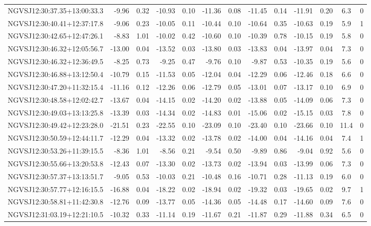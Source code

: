 \begin{tabular}{lrrrrrrrrrrcc}
NGVSJ12:30:37.35+13:00:33.3 & -9.96 & 0.32 & -10.93 & 0.10 & -11.36 & 0.08 & -11.45 & 0.14 & -11.91 & 0.20 & 6.3 & 0 \\
NGVSJ12:30:40.41+12:37:17.8 & -9.06 & 0.23 & -10.05 & 0.11 & -10.44 & 0.10 & -10.64 & 0.35 & -10.63 & 0.19 & 5.9 & 1 \\
NGVSJ12:30:42.65+12:47:26.1 & -8.83 & 1.01 & -10.02 & 0.42 & -10.60 & 0.10 & -10.39 & 0.78 & -10.15 & 0.19 & 5.8 & 0 \\
NGVSJ12:30:46.32+12:05:56.7 & -13.00 & 0.04 & -13.52 & 0.03 & -13.80 & 0.03 & -13.83 & 0.04 & -13.97 & 0.04 & 7.3 & 0 \\
NGVSJ12:30:46.32+12:36:49.5 & -8.25 & 0.73 & -9.25 & 0.47 & -9.76 & 0.10 & -9.87 & 0.53 & -10.35 & 0.19 & 5.6 & 0 \\
NGVSJ12:30:46.88+13:12:50.4 & -10.79 & 0.15 & -11.53 & 0.05 & -12.04 & 0.04 & -12.29 & 0.06 & -12.46 & 0.18 & 6.6 & 0 \\
NGVSJ12:30:47.20+11:32:15.4 & -11.16 & 0.12 & -12.26 & 0.06 & -12.79 & 0.05 & -13.01 & 0.07 & -13.17 & 0.10 & 6.9 & 0 \\
NGVSJ12:30:48.58+12:02:42.7 & -13.67 & 0.04 & -14.15 & 0.02 & -14.20 & 0.02 & -13.88 & 0.05 & -14.09 & 0.06 & 7.3 & 0 \\
NGVSJ12:30:49.03+13:13:25.8 & -13.39 & 0.03 & -14.34 & 0.02 & -14.83 & 0.01 & -15.06 & 0.02 & -15.15 & 0.03 & 7.8 & 0 \\
NGVSJ12:30:49.42+12:23:28.0 & -21.51 & 0.23 & -22.55 & 0.10 & -23.09 & 0.10 & -23.40 & 0.10 & -23.66 & 0.10 & 11.4 & 0 \\
NGVSJ12:30:50.59+12:44:11.7 & -12.29 & 0.04 & -13.32 & 0.02 & -13.78 & 0.02 & -14.00 & 0.04 & -14.16 & 0.04 & 7.4 & 1 \\
NGVSJ12:30:53.26+11:39:15.5 & -8.36 & 1.01 & -8.56 & 0.21 & -9.54 & 0.50 & -9.89 & 0.86 & -9.04 & 0.92 & 5.6 & 0 \\
NGVSJ12:30:55.66+13:20:53.8 & -12.43 & 0.07 & -13.30 & 0.02 & -13.73 & 0.02 & -13.94 & 0.03 & -13.99 & 0.06 & 7.3 & 0 \\
NGVSJ12:30:57.37+13:13:51.7 & -9.05 & 0.53 & -10.03 & 0.21 & -10.48 & 0.16 & -10.71 & 0.28 & -11.13 & 0.19 & 6.0 & 0 \\
NGVSJ12:30:57.77+12:16:15.5 & -16.88 & 0.04 & -18.22 & 0.02 & -18.94 & 0.02 & -19.32 & 0.03 & -19.65 & 0.02 & 9.7 & 1 \\
NGVSJ12:30:58.81+11:42:30.8 & -12.76 & 0.09 & -13.77 & 0.05 & -14.36 & 0.05 & -14.48 & 0.17 & -14.60 & 0.09 & 7.6 & 0 \\
NGVSJ12:31:03.19+12:21:10.5 & -10.32 & 0.33 & -11.14 & 0.19 & -11.67 & 0.21 & -11.87 & 0.29 & -11.88 & 0.34 & 6.5 & 0 \\

\end{tabular}
